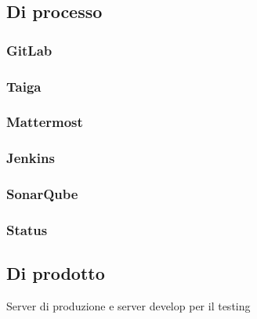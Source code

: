 \documentclass{article}
\begin{document}
\subsection{Di processo}

\subsubsection{GitLab}

\subsubsection{Taiga}

\subsubsection{Mattermost}

\subsubsection{Jenkins}

\subsubsection{SonarQube}

\subsubsection{Status}

\subsection{Di prodotto}
Server di produzione e server develop per il testing
\end{document}
